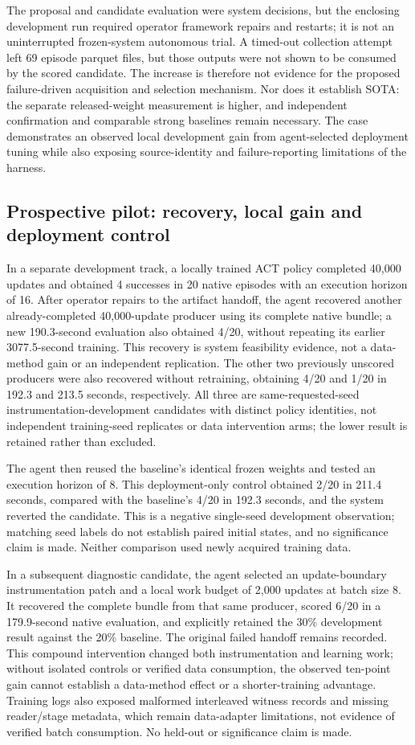 \documentclass[10pt,twocolumn,letterpaper]{article}
\begin{document}
The proposal and candidate evaluation were system decisions, but the enclosing
development run required operator framework repairs and restarts; it is not an
uninterrupted frozen-system autonomous trial. A timed-out collection attempt
left 69 episode parquet files, but those outputs were not shown to be consumed
by the scored candidate. The increase is therefore not evidence for the proposed
failure-driven acquisition and selection mechanism. Nor does it establish SOTA:
the separate released-weight measurement is higher, and independent confirmation
and comparable strong baselines remain necessary. The case demonstrates an
observed local development gain from agent-selected deployment tuning while
also exposing source-identity and failure-reporting limitations of the harness.

\subsection{Prospective pilot: recovery, local gain and deployment control}
In a separate development track, a locally trained ACT policy completed 40,000
updates and obtained 4 successes in 20 native episodes with an execution horizon
of 16. After operator repairs to the artifact handoff, the agent recovered another
already-completed 40,000-update producer using its complete native bundle; a new
190.3-second evaluation also obtained 4/20, without repeating its earlier
3077.5-second training. This recovery is system feasibility evidence, not a
data-method gain or an independent replication.
The other two previously unscored producers were also recovered without
retraining, obtaining 4/20 and 1/20 in 192.3 and 213.5 seconds, respectively.
All three are same-requested-seed instrumentation-development candidates with
distinct policy identities, not independent training-seed replicates or data
intervention arms; the lower result is retained rather than excluded.

The agent then reused the baseline's identical frozen weights and tested an
execution horizon of 8. This deployment-only control obtained 2/20 in 211.4
seconds, compared with the baseline's 4/20 in 192.3 seconds, and the system
reverted the candidate. This is a negative single-seed development observation;
matching seed labels do not establish paired initial states, and no significance
claim is made. Neither comparison used newly acquired training data.

In a subsequent diagnostic candidate, the agent selected an update-boundary
instrumentation patch and a local work budget of 2,000 updates at batch size 8.
It recovered the complete bundle from that same producer, scored 6/20 in a
179.9-second native evaluation, and explicitly retained the 30\% development
result against the 20\% baseline. The original failed handoff remains recorded.
This compound intervention changed both instrumentation and learning work;
without isolated controls or verified data consumption, the observed ten-point
gain cannot establish a data-method effect or a shorter-training advantage.
Training logs also exposed malformed interleaved witness records and missing
reader/stage metadata, which remain data-adapter limitations, not evidence of
verified batch consumption. No held-out or significance claim is made.
\end{document}
